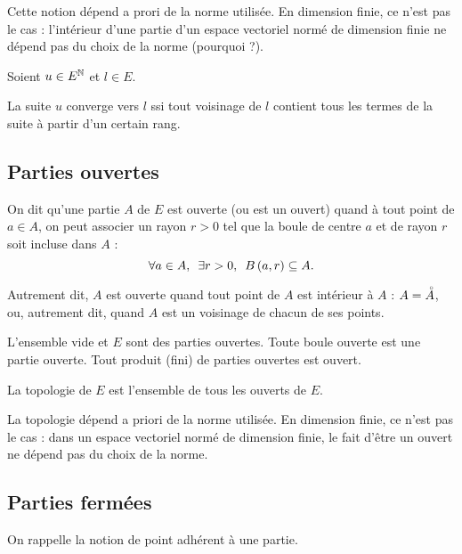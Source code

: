 \begin{rem}
Cette notion dépend a prori de la norme utilisée. En dimension finie, ce n'est pas le cas : l'intérieur d'une partie d'un espace vectoriel normé de dimension finie ne dépend pas du choix de la norme (pourquoi ?).
\end{rem}

\begin{prop}
Soient \(u\in E^{\mathbb{N}}\) et \(l\in E\).

La suite \(u\) converge vers \(l\) ssi tout voisinage de \(l\) contient tous les termes de la suite à partir d'un certain rang.
\end{prop}

\subsection{Parties ouvertes}

\begin{defi}
On dit qu'une partie \(A\) de \(E\) est ouverte (ou est un ouvert) quand à tout point de \(a\in A\), on peut associer un rayon \(r>0\) tel que la boule de centre \(a\) et de rayon \(r\) soit incluse dans \(A\) : \[\quantifs{\forall a\in A;\exists r>0}\bouleo{a}{r}\subset A.\]

Autrement dit, \(A\) est ouverte quand tout point de \(A\) est intérieur à \(A\) : \(A=\accentset{\circ}{A}\), ou, autrement dit, quand \(A\) est un voisinage de chacun de ses points.
\end{defi}

\begin{prop}
L'ensemble vide et \(E\) sont des parties ouvertes. Toute boule ouverte est une partie ouverte. Tout produit (fini) de parties ouvertes est ouvert.
\end{prop}

La topologie de \(E\) est l'ensemble de tous les ouverts de \(E\).

\begin{rem}
La topologie dépend a priori de la norme utilisée. En dimension finie, ce n'est pas le cas : dans un espace vectoriel normé de dimension finie, le fait d'être un ouvert ne dépend pas du choix de la norme.
\end{rem}

\subsection{Parties fermées}

On rappelle la notion de point adhérent à une partie.

